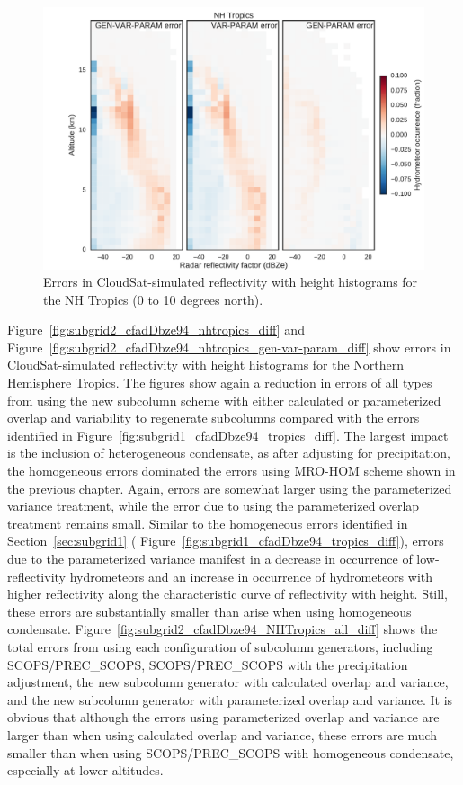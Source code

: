 \begin{figure}[htbp]
\centering
\includegraphics{graphics/subgrid2_cfadDbze94_NHTropics_gen-var-param_diff.pdf}
\caption{\label{fig:subgrid2_cfadDbze94_nhtropics_gen-var-param_diff}Errors
in CloudSat-simulated reflectivity with height histograms for the NH
Tropics (0 to 10 degrees
north).}\label{fig:subgrid2ux5fcfadDbze94ux5fnhtropicsux5fgen-var-paramux5fdiff}
\end{figure}

Figure~\ref{fig:subgrid2_cfadDbze94_nhtropics_diff} and
Figure~\ref{fig:subgrid2_cfadDbze94_nhtropics_gen-var-param_diff} show
errors in CloudSat-simulated reflectivity with height histograms for the
Northern Hemisphere Tropics. The figures show again a reduction in
errors of all types from using the new subcolumn scheme with either
calculated or parameterized overlap and variability to regenerate
subcolumns compared with the errors identified in
Figure~\ref{fig:subgrid1_cfadDbze94_tropics_diff}. The largest impact is
the inclusion of heterogeneous condensate, as after adjusting for
precipitation, the homogeneous errors dominated the errors using MRO-HOM
scheme shown in the previous chapter. Again, errors are somewhat larger
using the parameterized variance treatment, while the error due to using
the parameterized overlap treatment remains small. Similar to the
homogeneous errors identified in Section~\ref{sec:subgrid1} (
Figure~\ref{fig:subgrid1_cfadDbze94_tropics_diff}), errors due to the
parameterized variance manifest in a decrease in occurrence of
low-reflectivity hydrometeors and an increase in occurrence of
hydrometeors with higher reflectivity along the characteristic curve of
reflectivity with height. Still, these errors are substantially smaller
than arise when using homogeneous condensate.
Figure~\ref{fig:subgrid2_cfadDbze94_NHTropics_all_diff} shows the total
errors from using each configuration of subcolumn generators, including
SCOPS/PREC\_SCOPS, SCOPS/PREC\_SCOPS with the precipitation adjustment,
the new subcolumn generator with calculated overlap and variance, and
the new subcolumn generator with parameterized overlap and variance. It
is obvious that although the errors using parameterized overlap and
variance are larger than when using calculated overlap and variance,
these errors are much smaller than when using SCOPS/PREC\_SCOPS with
homogeneous condensate, especially at lower-altitudes.

